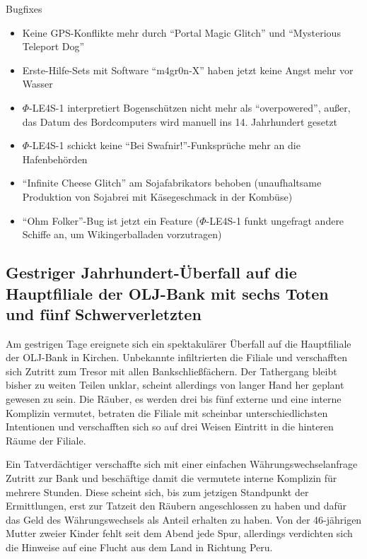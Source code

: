 \documentclass[final]{multiversum}
\begin{document}
\noindent Bugfixes
\begin{itemize}
    \item Keine GPS-Konflikte mehr durch \enquote{Portal Magic Glitch} und \enquote{Mysterious Teleport Dog}
    \item Erste-Hilfe-Sets mit Software \enquote{m4gr0n-X} haben jetzt keine Angst mehr
    vor Wasser
    \item $\Phi$-LE4S-1 interpretiert Bogenschützen nicht mehr als
    \enquote{overpowered}, außer, das Datum des Bordcomputers wird manuell ins 14.
    Jahrhundert gesetzt
    \item $\Phi$-LE4S-1 schickt keine \enquote{Bei Swafnir!}-Funksprüche mehr an die
    Hafenbehörden
    \item \enquote{Infinite Cheese Glitch} am Sojafabrikators behoben
    (unaufhaltsame Produktion von Sojabrei mit Käsegeschmack in der Kombüse)
    \item \enquote{Ohm Folker}-Bug ist jetzt ein Feature ($\Phi$-LE4S-1 funkt
    ungefragt andere Schiffe an, um Wikingerballaden vorzutragen)
\end{itemize} 

\subsection{Gestriger Jahrhundert-Überfall auf die Hauptfiliale der OLJ-Bank mit sechs Toten und fünf Schwerverletzten}
Am gestrigen Tage ereignete sich ein spektakulärer Überfall auf die Hauptfiliale
der OLJ-Bank in Kirchen. Unbekannte infiltrierten die Filiale und verschafften
sich Zutritt zum Tresor mit allen Bankschließfächern. Der Tathergang bleibt
bisher zu weiten Teilen unklar, scheint allerdings von langer Hand her geplant
gewesen zu sein. Die Räuber, es werden drei bis fünf externe und eine interne Komplizin
vermutet, betraten die Filiale mit scheinbar unterschiedlichsten Intentionen und
verschafften sich so auf drei Weisen Eintritt in die hinteren Räume der Filiale.

Ein Tatverdächtiger verschaffte sich mit einer einfachen Währungswechselanfrage
Zutritt zur Bank und beschäftige damit die vermutete interne Komplizin für
mehrere Stunden. Diese scheint sich, bis zum jetzigen Standpunkt der
Ermittlungen, erst zur Tatzeit den Räubern angeschlossen zu haben und dafür das
Geld des Währungswechsels als Anteil erhalten zu haben. Von der 46-jährigen
Mutter zweier Kinder fehlt seit dem Abend jede Spur, allerdings verdichten sich
die Hinweise auf eine Flucht aus dem Land in Richtung Peru.
\end{document}
